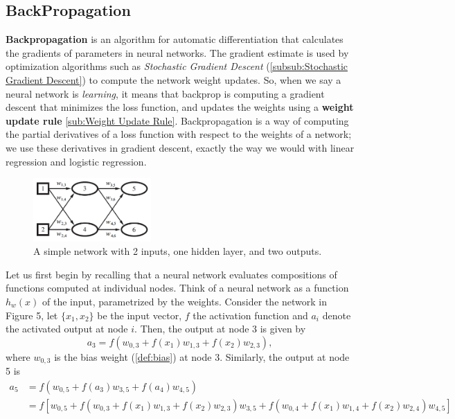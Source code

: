 \documentclass{article}
\begin{document}
\subsection{BackPropagation}%
  \label{sub:BackPropagation}
\textbf{Backpropagation} is an algorithm for automatic differentiation that calculates the gradients of parameters in neural networks. The gradient estimate is used by optimization algorithms such as \textit{Stochastic Gradient Descent} (\autoref{subsub:Stochastic Gradient Descent}) to compute the network weight updates. So, when we say a neural network is \textit{learning}, it means that backprop is computing a gradient descent that minimizes the loss function, and updates the weights using a \textbf{weight update rule} \ref{sub:Weight Update Rule}. Backpropagation is a way of computing the partial derivatives of a loss function with respect to the weights of a network; we use these derivatives in gradient descent, exactly the way we would with linear regression and logistic regression. 
\begin{figure} %
    \centering
    \label{simpleNet}
    \includegraphics[width=0.4\textwidth]{simpleNet}
    \caption{A simple network with 2 inputs, one hidden layer, and two outputs.}
\end{figure}
  Let us first begin by recalling that a neural network evaluates compositions of functions computed at individual nodes. Think of a neural network as a function $h_w(x)$ of the input, parametrized by the weights. Consider the network in Figure 5, let $\{x_1,x_2\}$ be the input vector, $f$ the activation function and $a_i$ denote the activated output at node $i$. Then, the output at node 3 is given by
  $$a_3 = f(w_{0, 3} + f(x_1)w_{1,3} + f(x_2)w_{2,3}), $$
  where $w_{0,3}$ is the bias weight (\autoref{def:bias}) at node 3. Similarly, the output at node 5 is
  \begin{equation*}
    \begin{split}
      a_5 &= f( w_{0,5} + f(a_3) w_{3,5} + f(a_4) w_{4,5}  )\\ 
      &= f[w_{0,5} + f(w_{0, 3} + f(x_1)w_{1,3} + f(x_2)w_{2,3})w_{3,5} +f(w_{0, 4} + f(x_1)w_{1,4} + f(x_2)w_{2,4})w_{4,5} ]
    \end{split}
  \end{equation*}
\end{document}
